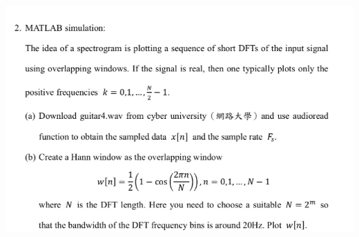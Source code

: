 \documentclass[a4paper]{article}
\begin{document}
	
	\begin{center}
		\includegraphics[width=1\linewidth]{screenshot100}
	\end{center}
	
\end{document}
